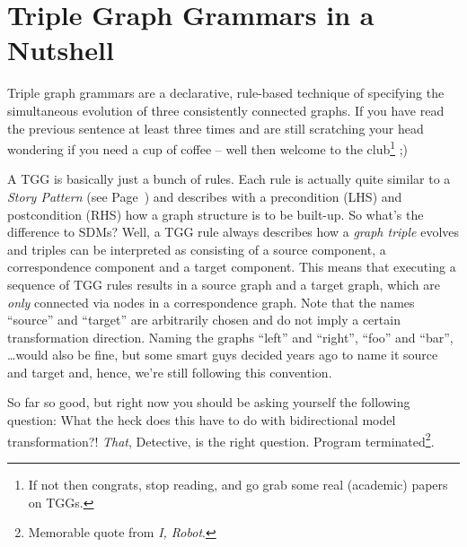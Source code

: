 \section{Triple Graph Grammars in a Nutshell}

Triple graph grammars are a declarative, rule-based technique of specifying the simultaneous evolution of three consistently connected graphs.
If you have read the previous sentence at least three times and are still scratching your head wondering if you need a cup of coffee -- well then welcome to the club\footnote{If not then congrats, stop reading, and go grab some real (academic) papers on TGGs.} ;)

A TGG is basically just a bunch of rules.
Each rule is actually quite similar to a \emph{Story Pattern} (see Page~\pageref{story-pattern}) and describes with a precondition (LHS) and postcondition (RHS) how a graph structure is to be built-up.
So what's the difference to SDMs?  
Well, a TGG rule always describes how a \emph{graph triple} evolves and triples can be interpreted as consisting of a source component, a correspondence component and a target component.
This means that executing a sequence of TGG rules results in a source graph and a target graph, which are \emph{only} connected via nodes in a correspondence graph.
Note that the names ``source'' and ``target'' are arbitrarily chosen and do not imply a certain transformation direction.
Naming the graphs ``left'' and ``right'', ``foo'' and ``bar'', \ldots would also be fine, but some smart guys decided years ago to name it source and target and, hence, we're still following this convention. 

So far so good, but right now you should be asking yourself the following question: What the {\huge heck} does this have to do with bidirectional model transformation?!  \emph{That}, Detective, is the right question. Program terminated\footnote{Memorable quote from \emph{I, Robot}.}.
\clearpage

